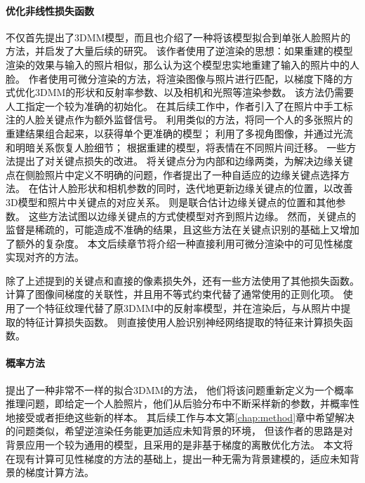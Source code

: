 \paragraph{优化非线性损失函数}
\citet{3DMM}不仅首先提出了3DMM模型，而且也介绍了一种将该模型拟合到单张人脸照片的方法，并启发了大量后续的研究。
该作者使用了逆渲染的思想：如果重建的模型渲染的效果与输入的照片相似，那么认为这个模型忠实地重建了输入的照片中的人脸。
作者使用可微分渲染的方法，将渲染图像与照片进行匹配，以梯度下降的方式优化3DMM的形状和反射率参数、以及相机和光照等渲染参数。
该方法仍需要人工指定一个较为准确的初始化。
在其后续工作\citep{BlanzV03}中，作者引入了在照片中手工标注的人脸关键点作为额外监督信号。
利用类似的方法，\citet{piotraschke2016automated}将同一个人的多张照片的重建结果组合起来，以获得单个更准确的模型；
\citet{cai2020}利用了多视角图像，并通过光流和明暗关系恢复人脸细节；
\citet{thies2016face2face}根据重建的模型，将表情在不同照片间迁移。
一些方法提出了对关键点损失的改进。
\citet{qu122015adaptive}将关键点分为内部和边缘两类，为解决边缘关键点在侧脸照片中定义不明确的问题，作者提出了一种自适应的边缘关键点选择方法。
\citet{liu2019single}在估计人脸形状和相机参数的同时，迭代地更新边缘关键点的位置，以改善3D模型和照片中关键点的对应关系。
\citet{zhu2015high}则是联合估计边缘关键点的位置和其他参数。
这些方法试图以边缘关键点的方式使模型对齐到照片边缘。
然而，关键点的监督是稀疏的，可能造成不准确的结果，且这些方法在关键点识别的基础上又增加了额外的复杂度。
本文后续章节将介绍一种直接利用可微分渲染中的可见性梯度实现对齐的方法。

除了上述提到的关键点和直接的像素损失外，还有一些方法使用了其他损失函数。
\citet{sariyanidi2020inequality}计算了图像间梯度的关联性，并且用不等式约束代替了通常使用的正则化项。
\citet{booth20183d}使用了一个特征纹理代替了原3DMM中的反射率模型，并在渲染后，与从照片中提取的特征计算损失函数。
\citet{gecer2019ganfit}则直接使用人脸识别神经网络提取的特征来计算损失函数。

\paragraph{概率方法}
\citet{schonborn2013monte}提出了一种非常不一样的拟合3DMM的方法，
他们将该问题重新定义为一个概率推理问题，即给定一个人脸照片，他们从后验分布中不断采样新的参数，并概率性地接受或者拒绝这些新的样本。
其后续工作\citep{SchonbornEFV15}与本文第\ref{chap:method}章中希望解决的问题类似，希望逆渲染任务能更加适应未知背景的环境，
但该作者的思路是对背景应用一个较为通用的模型，且采用的是非基于梯度的离散优化方法。
本文将在现有计算可见性梯度的方法的基础上，提出一种无需为背景建模的，适应未知背景的梯度计算方法。

